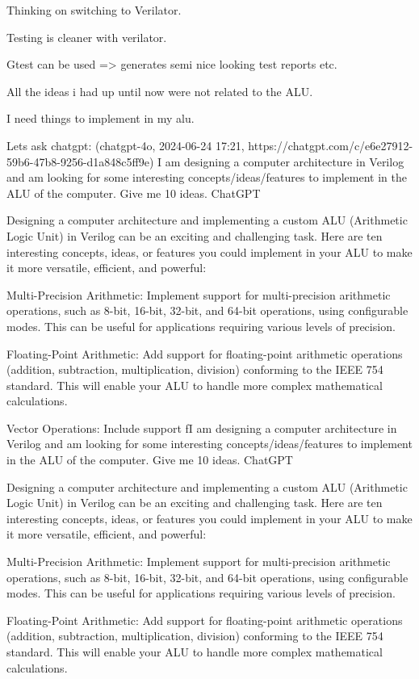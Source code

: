 Thinking on switching to Verilator.

Testing is cleaner with verilator. 

Gtest can be used => generates semi nice looking test reports etc. 

All the ideas i had up until now were not related to the ALU. 

I need things to implement in my alu. 




Lets ask chatgpt: (chatgpt-4o, 2024-06-24 17:21, https://chatgpt.com/c/e6e27912-59b6-47b8-9256-d1a848c5ff9e)
I am designing a computer architecture in Verilog and am looking for some interesting concepts/ideas/features to implement in the ALU of the computer. Give me 10 ideas.
ChatGPT

Designing a computer architecture and implementing a custom ALU (Arithmetic Logic Unit) in Verilog can be an exciting and challenging task. Here are ten interesting concepts, ideas, or features you could implement in your ALU to make it more versatile, efficient, and powerful:

    Multi-Precision Arithmetic: Implement support for multi-precision arithmetic operations, such as 8-bit, 16-bit, 32-bit, and 64-bit operations, using configurable modes. This can be useful for applications requiring various levels of precision.

    Floating-Point Arithmetic: Add support for floating-point arithmetic operations (addition, subtraction, multiplication, division) conforming to the IEEE 754 standard. This will enable your ALU to handle more complex mathematical calculations.

    Vector Operations: Include support fI am designing a computer architecture in Verilog and am looking for some interesting concepts/ideas/features to implement in the ALU of the computer. Give me 10 ideas.
ChatGPT

Designing a computer architecture and implementing a custom ALU (Arithmetic Logic Unit) in Verilog can be an exciting and challenging task. Here are ten interesting concepts, ideas, or features you could implement in your ALU to make it more versatile, efficient, and powerful:

    Multi-Precision Arithmetic: Implement support for multi-precision arithmetic operations, such as 8-bit, 16-bit, 32-bit, and 64-bit operations, using configurable modes. This can be useful for applications requiring various levels of precision.

    Floating-Point Arithmetic: Add support for floating-point arithmetic operations (addition, subtraction, multiplication, division) conforming to the IEEE 754 standard. This will enable your ALU to handle more complex mathematical calculations.

